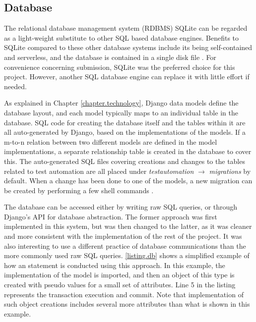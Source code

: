 \subsection{Database}

The relational database management system (RDBMS) SQLite can be regarded as a light-weight substitute to other SQL based database engines. Benefits to SQLite compared to these other database systems include its being self-contained and serverless, and the database is contained in a single disk file \cite{https://www.sqlite.org/about.html}. For convenience concerning submission, SQLite was the preferred choice for this project. However, another SQL database engine can replace it with little effort if needed.

As explained in Chapter \ref{chapter.technology}, Django data models define the database layout, and each model typically maps to an individual table in the database. SQL code for creating the database itself and the tables within it are all auto-generated by Django, based on the implementations of the models. If a m-to-n relation between two different models are defined in the model implementations, a separate relationship table is created in the database to cover this. The auto-generated SQL files covering creations and changes to the tables related to test automation are all placed under \emph{testautomation} $\rightarrow$ \emph{migrations} by default. When a change has been done to one of the models, a new migration can be created by performing a few shell commands \cite{https://docs.djangoproject.com/en/1.9/topics/migrations/}.

The database can be accessed either by writing raw SQL queries, or through Django's API for database abstraction. The former approach was first implemented in this system, but was then changed to the latter, as it was cleaner and more consistent with the implementation of the rest of the project. It was also interesting to use a different practice of database communications than the more commonly used raw SQL queries. \lstlistingname \space \ref{listing.db} shows a simplified example of how an  statement is conducted using this approach. In this example, the implementation of the  model is imported, and then an object of this type is created with pseudo values for a small set of attributes. Line 5 in the listing represents the transaction execution and commit. Note that implementation of such object creations includes several more attributes than what is shown in this example.


